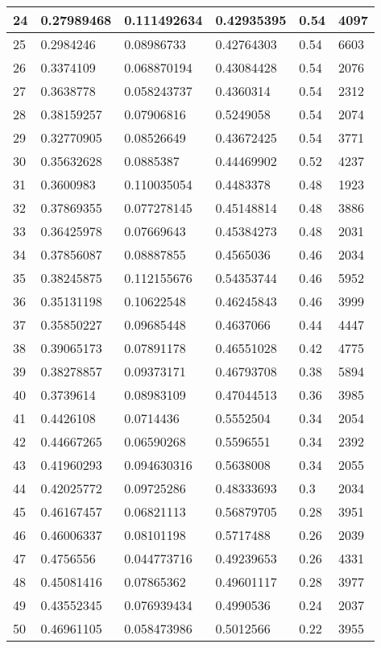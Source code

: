 \begin{longtable}{|l|l|l|l|l|l|}
24 & 0.27989468 & 0.111492634 & 0.42935395 & 0.54 & 4097 \\ \hline 
25 & 0.2984246 & 0.08986733 & 0.42764303 & 0.54 & 6603 \\ \hline 
26 & 0.3374109 & 0.068870194 & 0.43084428 & 0.54 & 2076 \\ \hline 
27 & 0.3638778 & 0.058243737 & 0.4360314 & 0.54 & 2312 \\ \hline 
28 & 0.38159257 & 0.07906816 & 0.5249058 & 0.54 & 2074 \\ \hline 
29 & 0.32770905 & 0.08526649 & 0.43672425 & 0.54 & 3771 \\ \hline 
30 & 0.35632628 & 0.0885387 & 0.44469902 & 0.52 & 4237 \\ \hline 
31 & 0.3600983 & 0.110035054 & 0.4483378 & 0.48 & 1923 \\ \hline 
32 & 0.37869355 & 0.077278145 & 0.45148814 & 0.48 & 3886 \\ \hline 
33 & 0.36425978 & 0.07669643 & 0.45384273 & 0.48 & 2031 \\ \hline 
34 & 0.37856087 & 0.08887855 & 0.4565036 & 0.46 & 2034 \\ \hline 
35 & 0.38245875 & 0.112155676 & 0.54353744 & 0.46 & 5952 \\ \hline 
36 & 0.35131198 & 0.10622548 & 0.46245843 & 0.46 & 3999 \\ \hline 
37 & 0.35850227 & 0.09685448 & 0.4637066 & 0.44 & 4447 \\ \hline 
38 & 0.39065173 & 0.07891178 & 0.46551028 & 0.42 & 4775 \\ \hline 
39 & 0.38278857 & 0.09373171 & 0.46793708 & 0.38 & 5894 \\ \hline 
40 & 0.3739614 & 0.08983109 & 0.47044513 & 0.36 & 3985 \\ \hline 
41 & 0.4426108 & 0.0714436 & 0.5552504 & 0.34 & 2054 \\ \hline 
42 & 0.44667265 & 0.06590268 & 0.5596551 & 0.34 & 2392 \\ \hline 
43 & 0.41960293 & 0.094630316 & 0.5638008 & 0.34 & 2055 \\ \hline 
44 & 0.42025772 & 0.09725286 & 0.48333693 & 0.3 & 2034 \\ \hline 
45 & 0.46167457 & 0.06821113 & 0.56879705 & 0.28 & 3951 \\ \hline 
46 & 0.46006337 & 0.08101198 & 0.5717488 & 0.26 & 2039 \\ \hline 
47 & 0.4756556 & 0.044773716 & 0.49239653 & 0.26 & 4331 \\ \hline 
48 & 0.45081416 & 0.07865362 & 0.49601117 & 0.28 & 3977 \\ \hline 
49 & 0.43552345 & 0.076939434 & 0.4990536 & 0.24 & 2037 \\ \hline 
50 & 0.46961105 & 0.058473986 & 0.5012566 & 0.22 & 3955 \\ \hline 
\end{longtable}
